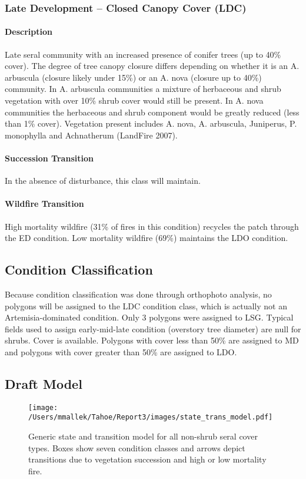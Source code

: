 \hrulefill


\subsubsection{Late Development – Closed Canopy Cover (LDC)} 

\paragraph{Description} Late seral community with an increased presence of conifer trees (up to 40\% cover). The degree of tree canopy closure differs depending on whether it is an A. arbuscula (closure likely under 15\%) or an A. nova (closure up to 40\%) community. In A. arbuscula communities a mixture of herbaceous and shrub vegetation with over 10\% shrub cover would still be present. In A. nova communities the herbaceous and shrub component would be greatly reduced (less than 1\% cover). Vegetation present includes A. nova, A. arbuscula, Juniperus, P. monophylla and Achnatherum (LandFire 2007).

\paragraph{Succession Transition} In the absence of disturbance, this class will maintain. 

\paragraph{Wildfire Transition} High mortality wildfire (31\% of fires in this condition) recycles the patch through the ED condition. Low mortality wildfire (69\%) maintains the LDO condition.

\hrulefill

\subsection{Condition Classification}
Because condition classification was done through orthophoto analysis, no polygons will be assigned to the LDC condition class, which is actually not an Artemisia-dominated condition. Only 3 polygons were assigned to LSG. Typical fields used to assign early-mid-late condition (overstory tree diameter) are null for shrubs. Cover is available. Polygons with cover less than 50\% are assigned to MD and polygons with cover greater than 50\% are assigned to LDO.

\subsection{Draft Model}
\begin{figure}[htbp]
\centering
\texttt{[image: /Users/mmallek/Tahoe/Report3/images/state\_trans\_model.pdf]}
\caption{Generic state and transition model for all non-shrub seral cover types. Boxes show seven condition classes and arrows depict transitions due to vegetation succession and high or low mortality fire.} 
\label{lsg_transmodel}
\end{figure}


